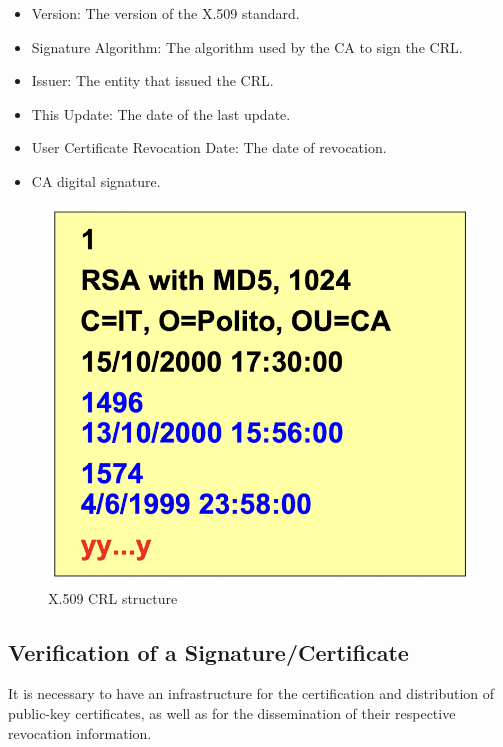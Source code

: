 \begin{multicols}{2}

    \begin{itemize}
        \item Version: The version of the X.509 standard.
        \item Signature Algorithm: The algorithm used by the CA to sign the CRL.
        \item Issuer: The entity that issued the CRL.
        \item This Update: The date of the last update.
        \item User Certificate Revocation Date: The date of revocation.
        \item CA digital signature.
    \end{itemize}
\columnbreak

    \begin{figure}[H]
        \centering
        \includegraphics[width=\linewidth]{Images/Cryptography/x509_crl.png}
        \caption{X.509 CRL structure}
    \end{figure}
\end{multicols}

\subsection{Verification of a Signature/Certificate}

\begin{tcolorbox}[colback=blue!10!white, colframe=blue!50!white]
    It is necessary to have an infrastructure for the certification and distribution of public-key certificates, as well as for the dissemination of their respective revocation information.
\end{tcolorbox}


